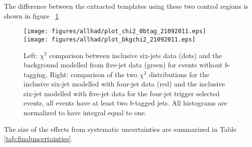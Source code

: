 The difference between the extracted templates using these two control regions is shown in figure ~\ref{fig:chi2.eps}
\begin{figure}[h!]
  \begin{center}
    \texttt{[image: figures/allhad/plot\_chi2\_0btag\_21092011.eps]} 
    \texttt{[image: figures/allhad/plot\_bkgchi2\_21092011.eps]}\\
  \end{center}
  \caption{Left: $\chi^2$ comparison between inclusive six-jets data (dots) and the background modelled from five-jet data (green) for events without $b$-tagging. Right: comparison of the two $\chi^2$ distributions for the inclusive six-jet modelled with four-jet data (red) and the inclusive six-jet modelled with five-jet data for the four-jet trigger selected events, all events have at least two $b$-tagged jets. All histograms are normalized to have integral equal to one.}
  \label{fig:chi2.eps}
\end{figure} 
The size of the effects from systematic uncertainties are summarized in Table \ref{tab:finaluncertainties}.
